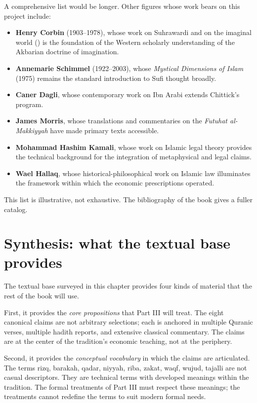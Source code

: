 A comprehensive list would be longer. Other figures whose work bears
on this project include:

\begin{itemize}[leftmargin=2em]
    \item \textbf{Henry Corbin} (1903--1978), whose work on
    Suhrawardi and on the imaginal world ()
    is the foundation of the Western scholarly understanding of the
    Akbarian doctrine of imagination.
    \item \textbf{Annemarie Schimmel} (1922--2003), whose
    \textit{Mystical Dimensions of Islam} (1975) remains the
    standard introduction to Sufi thought broadly.
    \item \textbf{Caner Dagli}, whose contemporary work on Ibn
    Arabi extends Chittick's program.
    \item \textbf{James Morris}, whose translations and commentaries
    on the \textit{Futuhat al-Makkiyyah} have made primary texts
    accessible.
    \item \textbf{Mohammad Hashim Kamali}, whose work on Islamic
    legal theory provides the technical background for the
    integration of metaphysical and legal claims.
    \item \textbf{Wael Hallaq}, whose historical-philosophical work
    on Islamic law illuminates the framework within which the
    economic prescriptions operated.
\end{itemize}

This list is illustrative, not exhaustive. The bibliography of the
book gives a fuller catalog.

\section{Synthesis: what the textual base provides}

The textual base surveyed in this chapter provides four kinds of
material that the rest of the book will use.

First, it provides the \emph{core propositions} that Part III will
treat. The eight canonical claims are not arbitrary selections; each
is anchored in multiple Quranic verses, multiple hadith reports, and
extensive classical commentary. The claims are at the center of the
tradition's economic teaching, not at the periphery.

Second, it provides the \emph{conceptual vocabulary} in which the
claims are articulated. The terms rizq, barakah, qadar, niyyah, riba,
zakat, waqf, wujud, tajalli are not casual descriptors. They are
technical terms with developed meanings within the tradition. The
formal treatments of Part III must respect these meanings; the
treatments cannot redefine the terms to suit modern formal needs.

